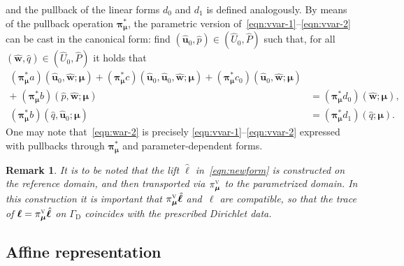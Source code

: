 \documentclass[onecolumn, twoside, a4paper, 11pt]{article}
\newtheorem{remark}{Remark}
\begin{document}
%
and the pullback of the linear forms $d_0$ and $d_1$ is defined analogously. By means of the
pullback operation ${\bm\pi}^*_{\bm\mu}$, the parametric version
of~\eqref{eqn:vvar-1}\nobreakdash--\eqref{eqn:vvar-2} can be cast
in the canonical form: find $(\hat{\bm u}_0, \hat{p}) \in (\hat{U}_0, \hat{P})$ such
that, for all $(\hat{\bm w}, \hat{q}) \in (\hat{U}_0, \hat{P})$ it holds
that
%
\begin{align}
  \nonumber (\bm\pi_{\bm\mu}^* a)(
    \hat{\bm u}_0,
    \hat{\bm w};
    \bm \mu
  ) + (\bm\pi_{\bm\mu}^* c)(
    \hat{\bm u}_0,
    \hat{\bm u}_0,
    \hat{\bm w};
    \bm \mu
  ) + (\bm\pi_{\bm\mu}^* c_0)(
    \hat{\bm u}_0,
    \hat{\bm w};
    \bm \mu
  )
  \\
  + \; (\bm\pi_{\bm\mu}^* b)(
    \hat{p},
    \hat{\bm w};
    \bm \mu
  ) &= (\bm\pi_{\bm\mu}^* d_0)(
    \hat{\bm w};
    \bm \mu
  )
  \label{eqn:war-1}, \\
  (\bm\pi_{\bm\mu}^* b)(
    \hat{q},
    \hat{\bm u}_0;
    \bm \mu
  ) &= (\bm\pi_{\bm\mu}^* d_1)(
    \hat{q};
    \bm \mu
  ). \label{eqn:war-2}
\end{align}
%
One may note that~\eqref{eqn:war-2} is precisely \eqref{eqn:vvar-1}--\eqref{eqn:vvar-2} expressed
with pullbacks through $\bm \pi_{\bm \mu}^*$ and parameter-dependent forms.


\begin{remark}
  \label{rem:lift}
  It is to be noted that the lift $\hat{\bm \ell}$ in~\eqref{eqn:newform} is constructed on
  the reference domain, and then transported
  via $\pi_{\bm \mu}^\textsc{v}$ to the parametrized domain. In this construction it is important
  that $\smash[t]{\pi_{\bm \mu}^\textsc{v} \hat{\bm \ell}}$ and~${\bm \ell}$ are compatible, so that
  the trace of $\bm{\ell}=\smash[t]{\pi_{\bm \mu}^\textsc{v}\hat{\bm \ell}}$ on $\Gamma_\text{D}$
  coincides with the prescribed Dirichlet data.
\end{remark}

\subsection{Affine representation}
\label{sec:affrep}
\end{document}
